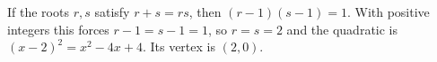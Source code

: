 If the roots $r,s$ satisfy $r+s=rs$, then $(r-1)(s-1)=1$. With positive integers this forces $r-1=s-1=1$, so $r=s=2$ and the quadratic is $(x-2)^2=x^2-4x+4$. Its vertex is $\boxed{(2,0)}$.
